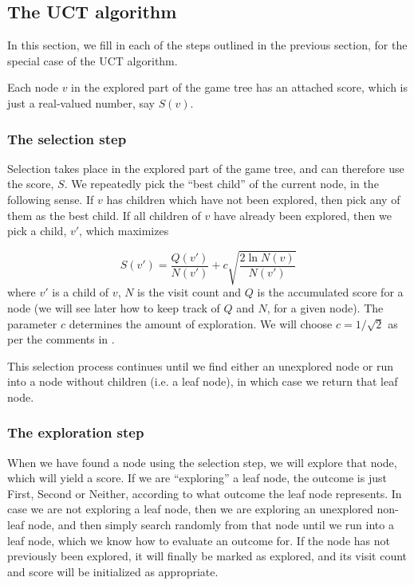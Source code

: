 \subsection{The UCT algorithm}
\label{sec:uct}

In this section, we fill in each of the steps outlined in the previous section, for the special case of the UCT algorithm.

Each node $v$ in the explored part of the game tree has an attached score, which is just a real-valued number, say $S(v)$.

\subsubsection{The selection step}
\label{subsec:uct_selection_step}

Selection takes place in the explored part of the game tree, and can therefore use the score, $S$.
We repeatedly pick the ``best child'' of the current node, in the following sense.
If $v$ has children which have not been explored, then pick any of them as the best child.
If all children of $v$ have already been explored, then we pick a child, $v'$, which maximizes

\begin{equation}
\label{eq:uctnodevalue}
S(v') = \frac{Q(v')}{N(v')} + c\sqrt{\frac{2\ln{N(v)}}{N(v')}}
\end{equation} 
where $v'$ is a child of $v$, $N$ is the visit count and $Q$ is the accumulated score for a node (we will see later how to keep track of $Q$ and $N$, for a given node).
The parameter $c$ determines the amount of exploration. We will choose $c = 1 / \sqrt 2$ as per the comments in \citep[p. 9]{mcts_survey12}.

This selection process continues until we find either an unexplored node or run into a node without children (i.e. a leaf node), in which case we return that leaf node.

\subsubsection{The exploration step}
\label{sec:exploration_step_explanation}

When we have found a node using the selection step, we will explore that node, which will yield a score.
If we are ``exploring'' a leaf node, the outcome is just First, Second or Neither, according to what outcome the leaf node represents.
In case we are not exploring a leaf node, then we are exploring an unexplored non-leaf node, and then simply search randomly from that node until we run into a leaf node, which we know how to evaluate an outcome for.
If the node has not previously been explored, it will finally be marked as explored, and its visit count and score will be initialized as appropriate.

